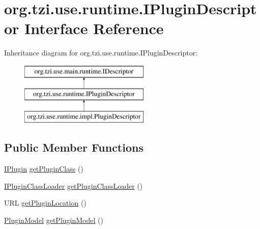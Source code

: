 \hypertarget{interfaceorg_1_1tzi_1_1use_1_1runtime_1_1_i_plugin_descriptor}{\section{org.\-tzi.\-use.\-runtime.\-I\-Plugin\-Descriptor Interface Reference}
\label{interfaceorg_1_1tzi_1_1use_1_1runtime_1_1_i_plugin_descriptor}
}
Inheritance diagram for org.\-tzi.\-use.\-runtime.\-I\-Plugin\-Descriptor\-:\begin{figure}[H]
\begin{center}
\leavevmode
\includegraphics[height=3.000000cm]{interfaceorg_1_1tzi_1_1use_1_1runtime_1_1_i_plugin_descriptor}
\end{center}
\end{figure}
\subsection*{Public Member Functions}
\begin{DoxyCompactItemize}
\item 
\hyperlink{interfaceorg_1_1tzi_1_1use_1_1runtime_1_1_i_plugin}{I\-Plugin} \hyperlink{interfaceorg_1_1tzi_1_1use_1_1runtime_1_1_i_plugin_descriptor_ae375726f0e806da570a2120439c985b7}{get\-Plugin\-Class} ()
\item 
\hyperlink{interfaceorg_1_1tzi_1_1use_1_1runtime_1_1_i_plugin_class_loader}{I\-Plugin\-Class\-Loader} \hyperlink{interfaceorg_1_1tzi_1_1use_1_1runtime_1_1_i_plugin_descriptor_aebcc07087ff2726b1fb4da56d3587e35}{get\-Plugin\-Class\-Loader} ()
\item 
U\-R\-L \hyperlink{interfaceorg_1_1tzi_1_1use_1_1runtime_1_1_i_plugin_descriptor_a398dd0266fc7638a7476b7c9c74a8833}{get\-Plugin\-Location} ()
\item 
\hyperlink{classorg_1_1tzi_1_1use_1_1runtime_1_1model_1_1_plugin_model}{Plugin\-Model} \hyperlink{interfaceorg_1_1tzi_1_1use_1_1runtime_1_1_i_plugin_descriptor_ab78b3953aa1ccc42f160cacecf83d58a}{get\-Plugin\-Model} ()
\end{DoxyCompactItemize}


